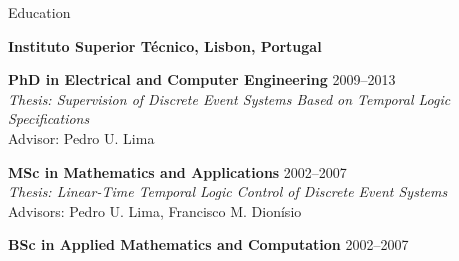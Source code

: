 
\begin{rSection}{Education}

\begin{rSubsection}{\bf Instituto Superior T\'ecnico, Lisbon, Portugal}{}{}{}
\item  \textbf{PhD in Electrical and Computer Engineering}  \hfill 2009--2013 \\
\textit{Thesis: Supervision of Discrete Event Systems Based on Temporal Logic Specifications} \\
Advisor: Pedro U. Lima

\item  \textbf{MSc in Mathematics and Applications }\hfill 2002--2007 \\
\textit{Thesis: Linear-Time Temporal Logic Control of Discrete Event Systems} \\
Advisors:  Pedro U. Lima,  Francisco M. Dion\'isio

\item  \textbf{BSc in Applied Mathematics and Computation}  \hfill 2002--2007 
\end{rSubsection}
\end{rSection}

